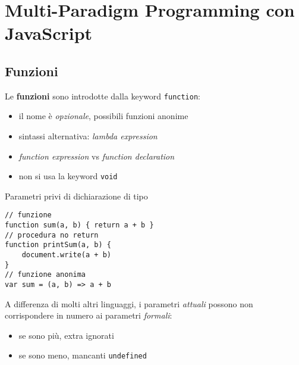 \chapter{Multi-Paradigm Programming con JavaScript}

\section{Funzioni}

Le \textbf{funzioni} sono introdotte dalla keyword \texttt{function}:
\begin{itemize}
    \item il nome è \textit{opzionale}, possibili funzioni anonime
    \item sintassi alternativa: \textit{lambda expression}
    \item \textit{function expression} vs \textit{function declaration}
    \item non si usa la keyword \texttt{void}
\end{itemize}

Parametri privi di dichiarazione di tipo
\begin{verbatim}
// funzione
function sum(a, b) { return a + b }
// procedura no return
function printSum(a, b) {
    document.write(a + b)
}
// funzione anonima
var sum = (a, b) => a + b
\end{verbatim}

A differenza di molti altri linguaggi, i parametri \textit{attuali} possono non corrispondere in numero ai parametri \textit{formali}:
\begin{itemize}
    \item se sono più, extra ignorati
    \item se sono meno, mancanti \texttt{undefined}
\end{itemize}


